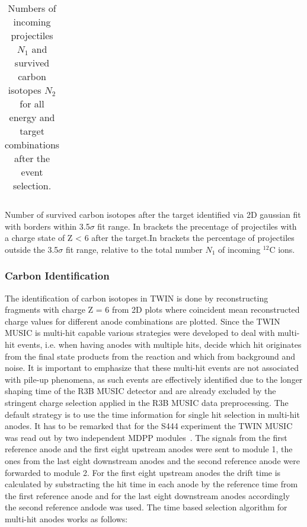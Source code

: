 \begin{table}[h!]
\begin{subtable}[c]{1.\textwidth}
\begin{tabular}{|c|c|c|c|c|}
\hline
\end{tabular}
\caption{Number of survived carbon isotopes after the target identified via 2D gaussian fit with borders within 3.5$\sigma$ fit range. In brackets the precentage of projectiles with a charge state of Z < 6 after the target.In brackets the percentage of projectiles outside the 3.5$\sigma$ fit range, relative to the total number $N_1$ of incoming $^{12}$C ions.}
\label{tab:survived_ions}
\end{subtable}
\caption{Numbers of incoming projectiles $N_1$ and survived carbon isotopes $N_2$ for all energy and target combinations after the event selection.}
\label{tab:overview_nr_cccs}
\end{table}
\subsubsection{Carbon Identification}\label{subsec:carbon_id}
The identification of carbon isotopes in TWIN is done by reconstructing fragments with charge Z = 6 from 2D plots where coincident mean reconstructed charge values for different anode combinations are plotted. Since the TWIN MUSIC is multi-hit capable various strategies were developed to deal with multi-hit events, i.e. when having anodes with multiple hits, decide which hit originates from the final state products from the reaction and which from background and noise. It is important to emphasize that these multi-hit events are not associated with pile-up phenomena, as such events are effectively identified due to the longer shaping time of the R3B MUSIC detector and are already excluded by the stringent charge selection applied in the R3B MUSIC data preprocessing.\newline
The default strategy is to use the time information for single hit selection in multi-hit anodes. It has to be remarked that for the S444 experiment the TWIN MUSIC was read out by two independent MDPP modules~\cite{MDPP-16}. The signals from the first reference anode and the first eight upstream anodes were sent to module 1, the ones from the last eight downstream anodes and the second reference anode were forwarded to module 2. For the first eight upstream anodes the drift time is calculated by substracting the hit time in each anode by the reference time from the first reference anode and for the last eight downstream anodes accordingly the second reference andode was used.\newline
The time based selection algorithm for multi-hit anodes works as follows:\newline
